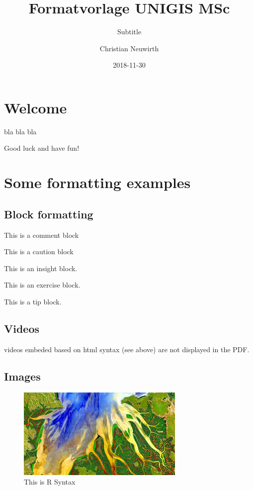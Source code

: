 \documentclass[]{book}
\title{Formatvorlage UNIGIS MSc}
\subtitle{Subtitle}
\author{Christian Neuwirth}
\date{2018-11-30}
\theoremstyle{definition}
\theoremstyle{definition}
\theoremstyle{definition}
\theoremstyle{remark}
\let\BeginKnitrBlock\begin \let\EndKnitrBlock\end
\begin{document}
\maketitle

{
\setcounter{tocdepth}{1}
\tableofcontents
}
\chapter*{Welcome}\label{welcome}

bla bla bla

Good luck and have fun!

\chapter{Some formatting examples}\label{some-formatting-examples}

\section{Block formatting}\label{block-formatting}

\BeginKnitrBlock{rmdcomment}
This is a comment block
\EndKnitrBlock{rmdcomment}

\BeginKnitrBlock{rmdcaution}
This is a caution block
\EndKnitrBlock{rmdcaution}

\BeginKnitrBlock{rmdinsight}
This is an insight block.
\EndKnitrBlock{rmdinsight}

\BeginKnitrBlock{rmdexercise}
This is an exercise block.
\EndKnitrBlock{rmdexercise}

\BeginKnitrBlock{rmdtip}
This is a tip block.
\EndKnitrBlock{rmdtip}

\section{Videos}\label{videos}

\BeginKnitrBlock{rmdcaution}
videos embeded based on html syntax (see above) are not displayed in the
PDF.
\EndKnitrBlock{rmdcaution}

\section{Images}\label{images}

\begin{figure}

{\centering \includegraphics[width=0.8\linewidth]{images/example-images2} 

}

\caption{This is R Syntax}\label{fig:fig13}
\end{figure}
\end{document}
